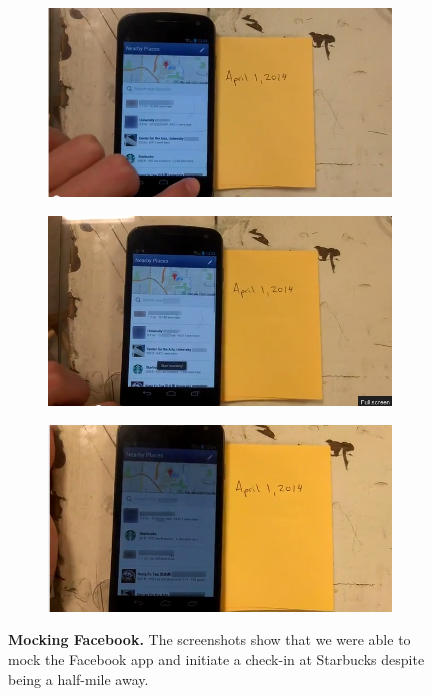 \begin{figure}[t]

\begin{subfigure}[t]{0.33\textwidth}
\includegraphics[width=\textwidth]{./figures/apps/facebook/facebook1.png}
\caption{}
\end{subfigure}%
\begin{subfigure}[t]{0.33\textwidth}
\includegraphics[width=\textwidth]{./figures/apps/facebook/facebook2.png}
\caption{}
\end{subfigure}%
\begin{subfigure}[t]{0.33\textwidth}
\includegraphics[width=\textwidth]{./figures/apps/facebook/facebook3.png}
\caption{}
\end{subfigure}

\caption{\textbf{Mocking Facebook.} The screenshots show that we were able to
mock the Facebook app and initiate a check-in at Starbucks despite being a
half-mile away.}

\label{fig-mocking-facebook}

\end{figure}


